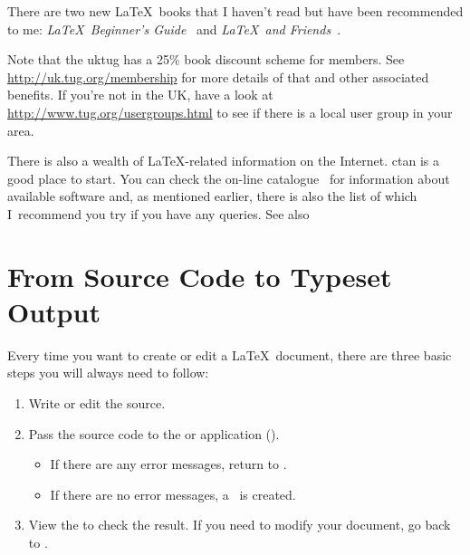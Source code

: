 There are two new \LaTeX\ books that I haven't read but have
been recommended to me: \emph{\LaTeX\ Beginner's
Guide}~\cite{kottwitz} and \emph{\LaTeX\ and
Friends}~\cite{vandongen}.

Note that the \gls{uktug} has a 25\% book discount scheme
for members. See \url{http://uk.tug.org/membership} for more details
of that and other associated benefits. If you're not in the
UK, have a look at \url{http://www.tug.org/usergroups.html} to see
if there is a local user group in your area.

There is also a wealth of \LaTeX-related information on the
Internet. \reportlinebreak\Gls{ctan} is a good place
to start. You can check the on-line catalogue~\cite{texcat} for
information about available software and, as mentioned earlier, there is also the list of
 which I~recommend you try if
you have any queries. See also 


\printkeywords
\html{}


\glsaddall[types=keywords]


\chapter{From Source Code to Typeset Output}
\label{ch:tex2pdf}

Every time you want to create or edit a \LaTeX\ document, there are three
basic steps you will always need to follow:

\begin{enumerate}
\item\label{itm:step1} Write or edit the \gls{source}.

\item\label{itm:step2} Pass the source code to the  or  application ().

\begin{itemize}
\item If there are any error messages, return to .
\item If there are no error messages, a 
\indexPDF\ is created.
\end{itemize}

\item\label{itm:step3} View the  to check
the result.  If you need to modify your document, go back to
. 
\end{enumerate}

